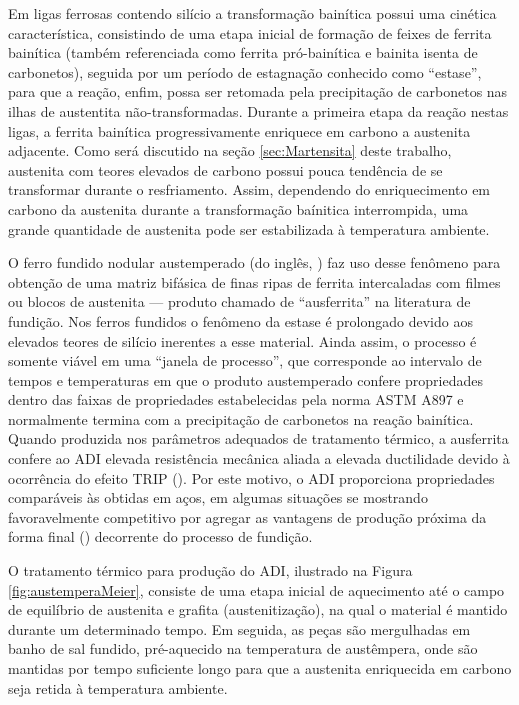 Em ligas ferrosas contendo silício a transformação bainítica possui uma cinética característica, consistindo de uma etapa inicial de formação de feixes de ferrita bainítica (também referenciada como ferrita pró-bainítica e bainita isenta de carbonetos), seguida por um período de estagnação conhecido como ``estase'', para que a reação, enfim, possa ser retomada pela precipitação de carbonetos nas ilhas de austentita não-transformadas\cite{Goldenstein2002}. %
Durante a primeira etapa da reação nestas ligas, a ferrita bainítica progressivamente enriquece em carbono a austenita adjacente. Como será discutido na seção \ref{sec:Martensita} deste trabalho, austenita com teores elevados de carbono possui pouca tendência de se transformar durante o resfriamento. Assim, dependendo do enriquecimento em carbono da austenita durante a transformação baínitica interrompida, uma grande quantidade de austenita pode ser estabilizada à temperatura ambiente.

O ferro fundido nodular austemperado (do inglês, ) faz uso desse fenômeno para obtenção de uma matriz bifásica de finas ripas de ferrita intercaladas com filmes ou blocos de austenita --- produto chamado de ``ausferrita'' na literatura de fundição. Nos ferros fundidos o fenômeno da estase é prolongado devido aos elevados teores de silício inerentes a esse material. Ainda assim, o processo é somente viável em uma ``janela de processo'', que corresponde ao intervalo de tempos e temperaturas em que o produto austemperado confere propriedades dentro das faixas de propriedades estabelecidas pela norma ASTM A897\cite{Bayati1999,A04Committee2016} e normalmente termina com a precipitação de carbonetos na reação bainítica. Quando produzida nos parâmetros adequados de tratamento térmico, a ausferrita confere ao ADI elevada resistência mecânica aliada a elevada ductilidade devido à ocorrência do efeito TRIP ()\cite{Goldenstein2002}. Por este motivo, o ADI proporciona propriedades comparáveis às obtidas em aços, em algumas situações se mostrando favoravelmente competitivo por agregar as vantagens de produção próxima da forma final () decorrente do processo de fundição\cite{Trudel1997,Hayrynen2002}.

O tratamento térmico para produção do ADI, ilustrado na Figura \ref{fig:austemperaMeier}, consiste de uma etapa inicial de aquecimento até o campo de equilíbrio de austenita e grafita (austenitização), na qual o material é mantido durante um determinado tempo. Em seguida, as peças são mergulhadas em banho de sal fundido, pré-aquecido na temperatura de austêmpera, onde são mantidas por tempo suficiente longo para que a austenita enriquecida em carbono seja retida à temperatura ambiente\cite{Trudel1997}.

